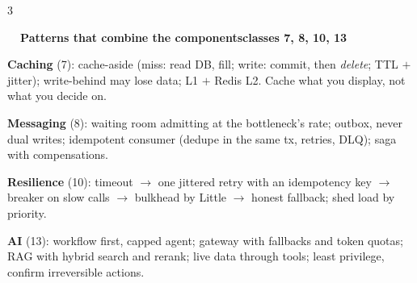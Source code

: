 \documentclass[10pt,a4paper]{article}
\newcommand{\sect}[4]{\par\vspace{.35em}%
  \begin{tcolorbox}[enhanced,colback=#1,colframe=#1,boxrule=0pt,arc=2pt,left=4pt,right=4pt,top=1.5pt,bottom=1.5pt,before skip=0pt,after skip=2pt]
    {\color{white}\small\bfseries #2\ \ #3\hfill{\scriptsize\mdseries #4}}
  \end{tcolorbox}}
\newcommand{\term}[1]{\textbf{#1}}
\begin{document}
\begin{multicols*}{3}
\sect{stC}{\faPuzzlePiece}{Patterns that combine the components}{classes 7, 8, 10, 13}
\begin{bul}
  \item \term{Caching} (7): cache-aside (miss: read DB, fill; write: commit, then \emph{delete}; TTL $+$ jitter); write-behind may lose data; L1 $+$ Redis L2. Cache what you display, not what you decide on.
  \item \term{Messaging} (8): waiting room admitting at the bottleneck's rate; outbox, never dual writes; idempotent consumer (dedupe in the same tx, retries, DLQ); saga with compensations.
  \item \term{Resilience} (10): timeout $\to$ one jittered retry with an idempotency key $\to$ breaker on slow calls $\to$ bulkhead by Little $\to$ honest fallback; shed load by priority.
  \item \term{AI} (13): workflow first, capped agent; gateway with fallbacks and token quotas; RAG with hybrid search and rerank; live data through tools; least privilege, confirm irreversible actions.
\end{bul}

\end{multicols*}
\end{document}
